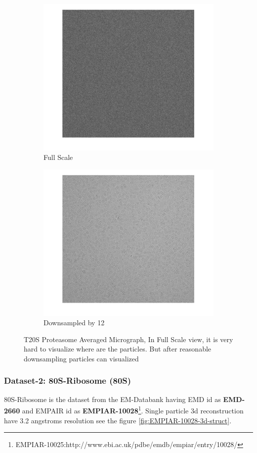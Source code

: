 \documentclass[twoside]{iitbreport}
\begin{document}
\begin{figure}[H]
\centering
\begin{subfigure}{.5\textwidth}
\centering
\includegraphics[width=0.5\linewidth]{EM-10025-micrograph-full_micrograph}
\captionsetup{justification=centering}
\caption{ Full Scale }
\end{subfigure} 
\begin{subfigure}{.48\textwidth}
\centering
\includegraphics[width=0.5\linewidth]{EM-10025-micrograph-full-down-12_micrograph}
\captionsetup{justification=centering}
\caption{Downsampled by 12}
\end{subfigure}
\captionsetup{justification=centering}
\caption{T20S Proteasome Averaged Micrograph, In Full Scale view, it is very hard to visualize where are the particles. But after reasonable downsampling particles can  visualized }
\label{fig:EM-10025-Avg-micrograph}
\end{figure}

\subsubsection{Dataset-2: 80S-Ribosome (80S)}\label{subsec:80S-Ribosome}
80S-Ribosome is the dataset from the EM-Databank having EMD id as \textbf{EMD-2660} and EMPAIR id as \textbf{EMPIAR-10028}\footnote{\label{fn:EMPIAR-10025-1} EMPIAR-10025:http://www.ebi.ac.uk/pdbe/emdb/empiar/entry/10028/}. Single particle 3d reconstruction have 3.2 angstroms resolution see the figure \ref{fig:EMPIAR-10028-3d-struct}.
\end{document}
